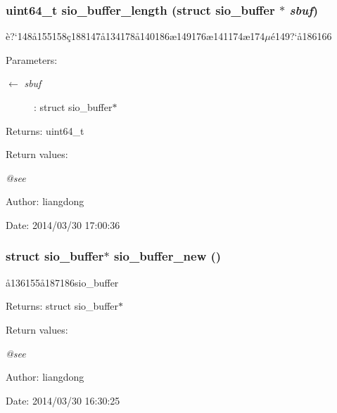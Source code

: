 \subsubsection{\setlength{\rightskip}{0pt plus 5cm}uint64\_\-t sio\_\-buffer\_\-length (struct sio\_\-buffer $\ast$ {\em sbuf})}\label{sio__buffer_8c_a8}


\`{e}?`148\aa{}155158\c{c}188147\aa{}134178\aa{}140186\ae{}149176\ae{}141174\ae{}174$\mu$\'{e}149?`\aa{}186166 

\begin{Desc}
\item[Parameters:]
\begin{description}
\item[\mbox{$\leftarrow$} {\em sbuf}]: struct sio\_\-buffer$\ast$ \end{description}
\end{Desc}
\begin{Desc}
\item[Returns:]uint64\_\-t \end{Desc}
\begin{Desc}
\item[Return values:]
\begin{description}
\item[{\em @see}]\end{description}
\end{Desc}
\begin{Desc}
\item[Author:]liangdong \end{Desc}
\begin{Desc}
\item[Date:]2014/03/30 17:00:36 \end{Desc}
\subsubsection{\setlength{\rightskip}{0pt plus 5cm}struct sio\_\-buffer$\ast$ sio\_\-buffer\_\-new ()}\label{sio__buffer_8c_a2}


\aa{}136155\aa{}187186sio\_\-buffer 

\begin{Desc}
\item[Returns:]struct sio\_\-buffer$\ast$ \end{Desc}
\begin{Desc}
\item[Return values:]
\begin{description}
\item[{\em @see}]\end{description}
\end{Desc}
\begin{Desc}
\item[Author:]liangdong \end{Desc}
\begin{Desc}
\item[Date:]2014/03/30 16:30:25 \end{Desc}
